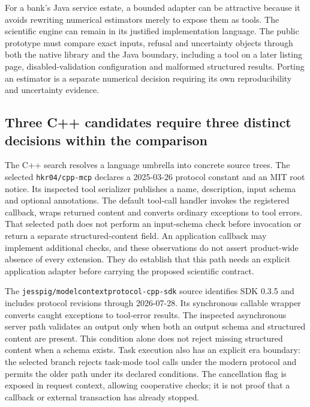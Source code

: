For a bank's Java service estate, a bounded adapter can be attractive because
it avoids rewriting numerical estimators merely to expose them as tools.
The scientific engine can remain in its justified implementation language.
The public prototype must compare exact inputs, refusal and uncertainty
objects through both the native library and the Java boundary, including a
tool on a later listing page, disabled-validation configuration and malformed
structured results. Porting an estimator is a separate numerical decision
requiring its own reproducibility and uncertainty evidence.
\citep{exec24_mcp_java,exec24_mcp_contracts}

\subsection{Three C++ candidates require three distinct decisions within the comparison}

The C++ search resolves a language umbrella into concrete source trees.
The selected \texttt{hkr04/cpp-mcp} declares a 2025-03-26 protocol constant
and an MIT root notice. Its inspected tool serializer publishes a name,
description, input schema and optional annotations. The default tool-call
handler invokes the registered callback, wraps returned content and
converts ordinary exceptions to tool errors. That selected path does not
perform an input-schema check before invocation or return a separate
structured-content field. An application callback may implement additional
checks, and these observations do not assert product-wide absence of every
extension. They do establish that this path needs an explicit application
adapter before carrying the proposed scientific contract.
\citep{exec24_mcp_cpp_hkr}

The \texttt{jesspig/modelcontextprotocol-cpp-sdk} source identifies SDK 0.3.5
and includes protocol revisions through 2026-07-28. Its synchronous callable
wrapper converts caught exceptions to tool-error results. The inspected
asynchronous server path validates an output only when both an output schema
and structured content are present. This condition alone does not reject
missing structured content when a schema exists. Task execution also has
an explicit era boundary: the selected branch rejects task-mode tool calls
under the modern protocol and permits the older path under its declared
conditions. The cancellation flag is exposed in request context, allowing
cooperative checks; it is not proof that a callback or external transaction
has already stopped.\citep{exec24_mcp_cpp_jesspig}

